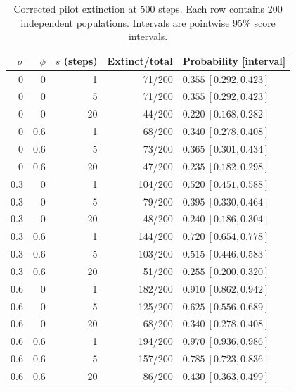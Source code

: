 \begin{table}[htbp]
\centering
\caption{Corrected pilot extinction at 500 steps. Each row contains 200 independent
populations. Intervals are pointwise 95\% score intervals.}
\label{num-pilot-extinction}
\begin{tabular}{rrrrl}
\toprule
$\sigma$ & $\phi$ & $s$ (steps) & Extinct/total & Probability [interval] \\
\midrule
0 & 0 & 1 & 71/200 & $0.355\ [0.292, 0.423]$ \\
0 & 0 & 5 & 71/200 & $0.355\ [0.292, 0.423]$ \\
0 & 0 & 20 & 44/200 & $0.220\ [0.168, 0.282]$ \\
0 & 0.6 & 1 & 68/200 & $0.340\ [0.278, 0.408]$ \\
0 & 0.6 & 5 & 73/200 & $0.365\ [0.301, 0.434]$ \\
0 & 0.6 & 20 & 47/200 & $0.235\ [0.182, 0.298]$ \\
0.3 & 0 & 1 & 104/200 & $0.520\ [0.451, 0.588]$ \\
0.3 & 0 & 5 & 79/200 & $0.395\ [0.330, 0.464]$ \\
0.3 & 0 & 20 & 48/200 & $0.240\ [0.186, 0.304]$ \\
0.3 & 0.6 & 1 & 144/200 & $0.720\ [0.654, 0.778]$ \\
0.3 & 0.6 & 5 & 103/200 & $0.515\ [0.446, 0.583]$ \\
0.3 & 0.6 & 20 & 51/200 & $0.255\ [0.200, 0.320]$ \\
0.6 & 0 & 1 & 182/200 & $0.910\ [0.862, 0.942]$ \\
0.6 & 0 & 5 & 125/200 & $0.625\ [0.556, 0.689]$ \\
0.6 & 0 & 20 & 68/200 & $0.340\ [0.278, 0.408]$ \\
0.6 & 0.6 & 1 & 194/200 & $0.970\ [0.936, 0.986]$ \\
0.6 & 0.6 & 5 & 157/200 & $0.785\ [0.723, 0.836]$ \\
0.6 & 0.6 & 20 & 86/200 & $0.430\ [0.363, 0.499]$ \\
\bottomrule
\end{tabular}
\end{table}

